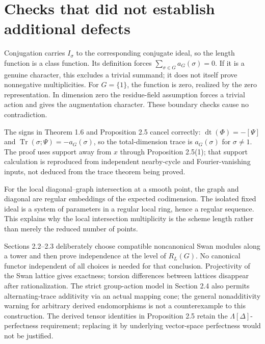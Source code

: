 \documentclass[10pt]{article}
\begin{document}
\section*{Checks that did not establish additional defects}
Conjugation carries \(I_\sigma\) to the corresponding conjugate ideal, so the length function is a class function. Its definition forces \(\sum_{\sigma\in G}a_G(\sigma)=0\). If it is a genuine character, this excludes a trivial summand; it does not itself prove nonnegative multiplicities. For \(G=\{1\}\), the function is zero, realized by the zero representation. In dimension zero the residue-field assumption forces a trivial action and gives the augmentation character. These boundary checks cause no contradiction.\par
The signs in Theorem 1.6 and Proposition 2.5 cancel correctly: \(\operatorname{dt}(\Phi)=-[\Psi]\) and \(\operatorname{Tr}(\sigma;\Psi)=-a_G(\sigma)\), so the total-dimension trace is \(a_G(\sigma)\) for \(\sigma\ne1\). The proof uses support away from \(x\) through Proposition 2.5(1); that support calculation is reproduced from independent nearby-cycle and Fourier-vanishing inputs, not deduced from the trace theorem being proved.\par
For the local diagonal–graph intersection at a smooth point, the graph and diagonal are regular embeddings of the expected codimension. The isolated fixed ideal is a system of parameters in a regular local ring, hence a regular sequence. This explains why the local intersection multiplicity is the scheme length rather than merely the reduced number of points.\par
Sections 2.2–2.3 deliberately choose compatible noncanonical Swan modules along a tower and then prove independence at the level of \(R_L(G)\). No canonical functor independent of all choices is needed for that conclusion. Projectivity of the Swan lattice gives exactness; torsion differences between lattices disappear after rationalization. The strict group-action model in Section 2.4 also permits alternating-trace additivity via an actual mapping cone; the general nonadditivity warning for arbitrary derived endomorphisms is not a counterexample to this construction. The derived tensor identities in Proposition 2.5 retain the \(\Lambda[\Delta]\)-perfectness requirement; replacing it by underlying vector-space perfectness would not be justified.\par
\end{document}
